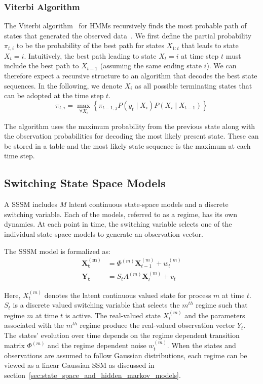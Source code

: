 \subsubsection{Viterbi Algorithm}\label{sec:viterbi_algorithm}
The Viterbi algorithm~\citep{forney1973viterbi} for HMMs recursively finds the most probable path of states that generated the observed data~\citep{nasrabadi2007pattern}. We first define the partial probability $\pi_{t,i}$ to be the probability of the best path for states $X_{1:t}$ that leads to state $X_t = i$. Intuitively, the best path leading to state $X_t = i$ at time step $t$ must include the best path to $X_{t-1}$ (assuming the same ending state $i$). We can therefore expect a recursive structure to an algorithm that decodes the best state sequences. In the following, we denote $X_i$ as all possible terminating states that can be adopted at the time step $t$.
\begin{equation}\label{eq:viterbi}
  \pi_{t,i} = \max\limits_{\forall X_i} \left\{ \pi_{t-1,j} P(y_t \mid X_i)P(X_i \mid X_{t-1}) \right\}
\end{equation}

The algorithm uses the maximum probability from the previous state along with the observation probabilities for decoding the most likely present state. These can be stored in a table and the most likely state sequence is the maximum at each time step.



\subsection{Switching State Space Models}\label{sec:switching_state_space_models}
A SSSM includes $M$ latent continuous state-space models and a discrete switching variable. Each of the models, referred to as a regime, has its own dynamics. At each point in time, the switching variable selects one of the individual state-space models to generate an observation vector.

The SSSM model is formalized as:
\begin{equation}
  \begin{split}
      \mathbf{X^{(m)}_t} &= \Phi^{(m)}\mathbf{X}^{(m)}_{t-1} + w^{(m)}_t \\
      \mathbf{Y_t} &= S_t A^{(m)}\mathbf{X}^{(m)}_t + v_t
  \end{split}\label{eq:switching_state_space}
\end{equation}

Here, $X_t^{(m)}$ denotes the latent continuous valued state for process $m$ at time $t$. $S_t$ is a discrete valued switching variable that selects the $m^{th}$ regime such that regime $m$ at time $t$ is active. The real-valued state $X_t^{(m)}$ and the parameters associated with the $m^{th}$ regime produce the real-valued observation vector $Y_t$. The states' evolution over time depends on the regime dependent transition matrix $\Phi^{(m)}$ and the regime dependent noise $w_t^{(m)}$. When the states and observations are assumed to follow Gaussian distributions, each regime can be viewed as a linear Gaussian SSM as discussed in section~\ref{sec:state_space_and_hidden_markov_models}.

